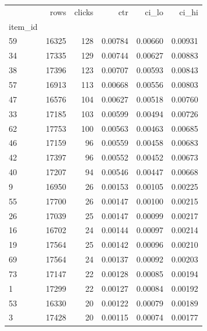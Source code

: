 \begin{tabular}{lrrrrr}
\toprule
 & rows & clicks & ctr & ci\_lo & ci\_hi \\
item\_id &  &  &  &  &  \\
\midrule
59 & 16325 & 128 & 0.00784 & 0.00660 & 0.00931 \\
34 & 17335 & 129 & 0.00744 & 0.00627 & 0.00883 \\
38 & 17396 & 123 & 0.00707 & 0.00593 & 0.00843 \\
57 & 16913 & 113 & 0.00668 & 0.00556 & 0.00803 \\
47 & 16576 & 104 & 0.00627 & 0.00518 & 0.00760 \\
33 & 17185 & 103 & 0.00599 & 0.00494 & 0.00726 \\
62 & 17753 & 100 & 0.00563 & 0.00463 & 0.00685 \\
46 & 17159 & 96 & 0.00559 & 0.00458 & 0.00683 \\
42 & 17397 & 96 & 0.00552 & 0.00452 & 0.00673 \\
40 & 17207 & 94 & 0.00546 & 0.00447 & 0.00668 \\
9 & 16950 & 26 & 0.00153 & 0.00105 & 0.00225 \\
55 & 17700 & 26 & 0.00147 & 0.00100 & 0.00215 \\
26 & 17039 & 25 & 0.00147 & 0.00099 & 0.00217 \\
16 & 16702 & 24 & 0.00144 & 0.00097 & 0.00214 \\
19 & 17564 & 25 & 0.00142 & 0.00096 & 0.00210 \\
69 & 17564 & 24 & 0.00137 & 0.00092 & 0.00203 \\
73 & 17147 & 22 & 0.00128 & 0.00085 & 0.00194 \\
1 & 17299 & 22 & 0.00127 & 0.00084 & 0.00192 \\
53 & 16330 & 20 & 0.00122 & 0.00079 & 0.00189 \\
3 & 17428 & 20 & 0.00115 & 0.00074 & 0.00177 \\
\bottomrule
\end{tabular}
